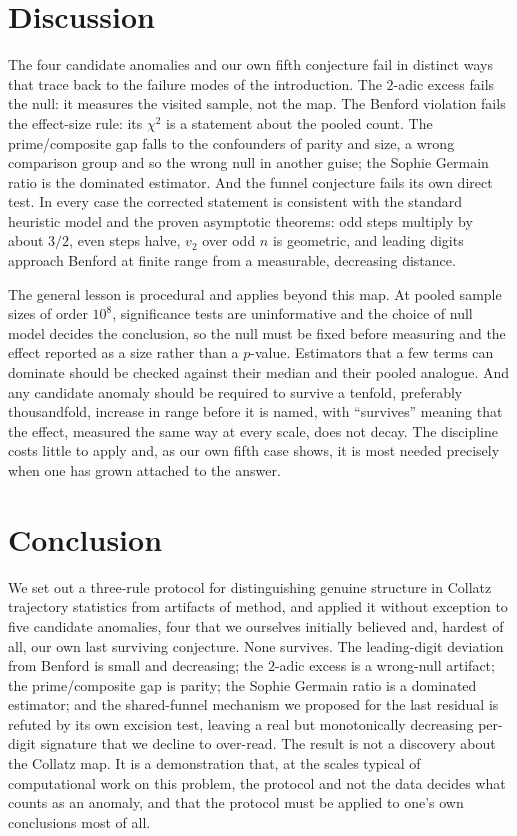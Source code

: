 \documentclass[11pt]{amsart}
\begin{document}
\section{Discussion}\label{sec:discussion}

The four candidate anomalies and our own fifth conjecture fail in distinct ways that trace back to the failure modes of the introduction. The $2$-adic excess fails the null: it measures the visited sample, not the map. The Benford violation fails the effect-size rule: its $\chi^2$ is a statement about the pooled count. The prime/composite gap falls to the confounders of parity and size, a wrong comparison group and so the wrong null in another guise; the Sophie Germain ratio is the dominated estimator. And the funnel conjecture fails its own direct test. In every case the corrected statement is consistent with the standard heuristic model and the proven asymptotic theorems: odd steps multiply by about $3/2$, even steps halve, $v_2$ over odd $n$ is geometric, and leading digits approach Benford at finite range from a measurable, decreasing distance.

The general lesson is procedural and applies beyond this map. At pooled sample sizes of order $10^8$, significance tests are uninformative and the choice of null model decides the conclusion, so the null must be fixed before measuring and the effect reported as a size rather than a $p$-value. Estimators that a few terms can dominate should be checked against their median and their pooled analogue. And any candidate anomaly should be required to survive a tenfold, preferably thousandfold, increase in range before it is named, with ``survives'' meaning that the effect, measured the same way at every scale, does not decay. The discipline costs little to apply and, as our own fifth case shows, it is most needed precisely when one has grown attached to the answer.

\section{Conclusion}

We set out a three-rule protocol for distinguishing genuine structure in Collatz trajectory statistics from artifacts of method, and applied it without exception to five candidate anomalies, four that we ourselves initially believed and, hardest of all, our own last surviving conjecture. None survives. The leading-digit deviation from Benford is small and decreasing; the $2$-adic excess is a wrong-null artifact; the prime/composite gap is parity; the Sophie Germain ratio is a dominated estimator; and the shared-funnel mechanism we proposed for the last residual is refuted by its own excision test, leaving a real but monotonically decreasing per-digit signature that we decline to over-read. The result is not a discovery about the Collatz map. It is a demonstration that, at the scales typical of computational work on this problem, the protocol and not the data decides what counts as an anomaly, and that the protocol must be applied to one's own conclusions most of all.
\end{document}
